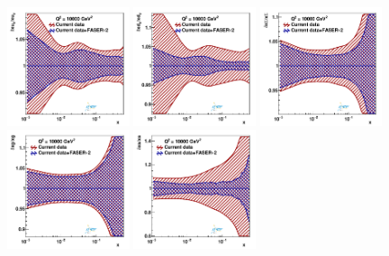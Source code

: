 \begin{figure}[t]
\centering
\includegraphics[width=0.32\textwidth]{plots/nuclear_fasernu2/inclusive+charm_chargediscrimination/statOnly_FASERv2_q2_10000_pdf_uv_ratio.pdf}
\includegraphics[width=0.32\textwidth]{plots/nuclear_fasernu2/inclusive+charm_chargediscrimination/statOnly_FASERv2_q2_10000_pdf_dv_ratio.pdf}
\includegraphics[width=0.32\textwidth]{plots/nuclear_fasernu2/inclusive+charm_chargediscrimination/statOnly_FASERv2_q2_10000_pdf_Sea_ratio.pdf}\\
\includegraphics[width=0.32\textwidth]{plots/nuclear_fasernu2/inclusive+charm_chargediscrimination/statOnly_FASERv2_q2_10000_pdf_g_ratio.pdf}
\includegraphics[width=0.32\textwidth]{plots/nuclear_fasernu2/inclusive+charm_chargediscrimination/statOnly_FASERv2_q2_10000_pdf_s_ratio.pdf}

\end{figure}
